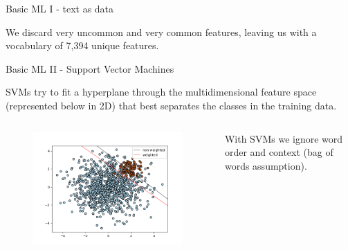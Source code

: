 \documentclass[9pt]{beamer}
\begin{document}
\begin{frame}{Basic ML I - text as data}
\medskip

We discard very uncommon and very common features, leaving us with a vocabulary of 7,394 unique features.

\end{frame}

\begin{frame}{Basic ML II - Support Vector Machines}

SVMs try to fit a hyperplane through the multidimensional feature space (represented below in 2D) that best separates the classes in the training data.

\begin{columns}
\begin{column}{0.618\linewidth}
	\begin{figure}
		\includegraphics[width=\linewidth]{images/svc_sklearn_unbalanced.png}
	\end{figure}
\end{column}
\begin{column}{0.382\linewidth}
	With SVMs we ignore word order and context (bag of words assumption).
\end{column}
\end{columns}

\end{frame}
\end{document}
